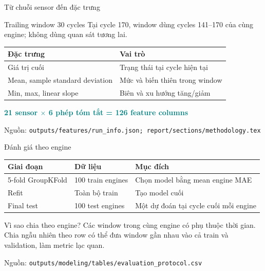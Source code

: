 \documentclass[aspectratio=169,professionalfonts]{beamer}
\newcommand{\source}[1]{\vfill\hspace{0pt}\scriptsize\color{muted}Nguồn: \nolinkurl{#1}}
\begin{document}
\begin{frame}{Từ chuỗi sensor đến đặc trưng}
\begin{block}{Trailing window 30 cycles}
Tại cycle 170, window dùng cycles 141--170 của cùng engine; không dùng quan sát tương lai.
\end{block}

\begin{table}
\centering\small
\begin{tabular}{ll}
\toprule
Đặc trưng & Vai trò\\
\midrule
Giá trị cuối & Trạng thái tại cycle hiện tại\\
Mean, sample standard deviation & Mức và biến thiên trong window\\
Min, max, linear slope & Biên và xu hướng tăng/giảm\\
\bottomrule
\end{tabular}
\end{table}

\centering
\textcolor{teal}{\Large\bfseries 21 sensor $\times$ 6 phép tóm tắt = 126 feature columns}

\source{outputs/features/run_info.json; report/sections/methodology.tex}
\end{frame}

\begin{frame}{Đánh giá theo engine}
\begin{table}
\centering\small
\begin{tabular}{lll}
\toprule
Giai đoạn & Dữ liệu & Mục đích\\
\midrule
5-fold GroupKFold & 100 train engines & Chọn model bằng mean engine MAE\\
Refit & Toàn bộ train & Tạo model cuối\\
Final test & 100 test engines & Một dự đoán tại cycle cuối mỗi engine\\
\bottomrule
\end{tabular}
\end{table}

\begin{alertblock}{Vì sao chia theo engine?}
Các window trong cùng engine có phụ thuộc thời gian. Chia ngẫu nhiên theo row
có thể đưa window gần nhau vào cả train và validation, làm metric lạc quan.
\end{alertblock}
\source{outputs/modeling/tables/evaluation_protocol.csv}
\end{frame}
\end{document}

